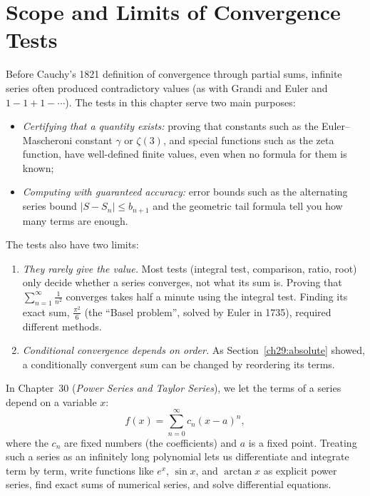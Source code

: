 \section{Scope and Limits of Convergence Tests}

\begin{connectionbox}
Before Cauchy's 1821 definition of convergence through partial sums, infinite series often produced contradictory values (as with Grandi and Euler and $1 - 1 + 1 - \cdots$). The tests in this chapter serve two main purposes:
\begin{itemize}
  \item \emph{Certifying that a quantity exists:} proving that constants such as the
  Euler--Mascheroni constant $\gamma$ or $\zeta(3)$, and special functions such as the
  zeta function, have well-defined finite values, even when no formula for them is known;
  \item \emph{Computing with guaranteed accuracy:} error bounds such as the alternating
  series bound $|S - S_n| \le b_{n+1}$ and the geometric tail formula tell you how many terms
  are enough.
\end{itemize}

The tests also have two limits:
\begin{enumerate}
  \item \emph{They rarely give the value.} Most tests (integral test, comparison, ratio, root)
  only decide whether a series converges, not what its sum is. Proving that
  $\sum_{n=1}^\infty \frac{1}{n^2}$ converges takes half a minute using the integral test. Finding its
  exact sum, $\frac{\pi^2}{6}$ (the ``Basel problem'', solved by Euler in 1735), required
  different methods.
  \item \emph{Conditional convergence depends on order.} As Section~\ref{ch29:absolute}
  showed, a conditionally convergent sum can be changed by reordering its terms.
\end{enumerate}

In Chapter~30 (\emph{Power Series and Taylor Series}), we let the terms of a series
depend on a variable $x$:
\[
  f(x) = \sum_{n=0}^{\infty} c_n (x - a)^n ,
\]
where the $c_n$ are fixed numbers (the coefficients) and $a$ is a fixed point.
Treating such a series as an infinitely long polynomial lets us differentiate and integrate
term by term, write functions like $e^x$, $\sin x$, and $\arctan x$ as explicit power series,
find exact sums of numerical series, and solve differential equations.
\end{connectionbox}

